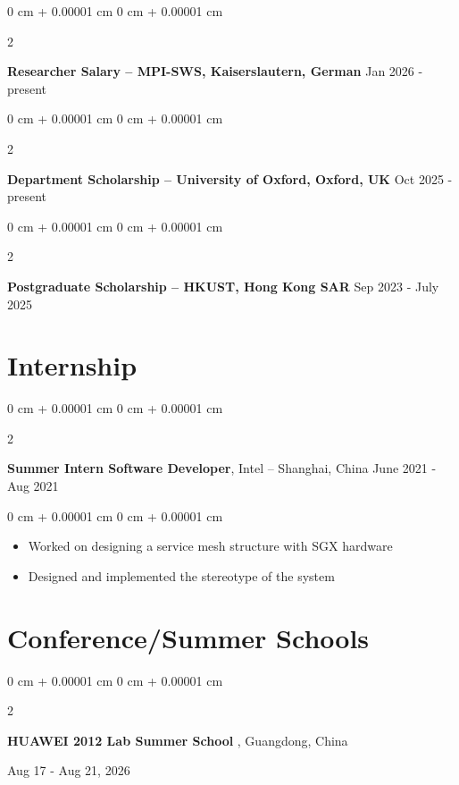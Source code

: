 \documentclass[10pt, letterpaper]{article}
\newenvironment{highlights}{
    \begin{itemize}[
        topsep=0.10 cm,
        parsep=0.10 cm,
        partopsep=0pt,
        itemsep=0pt,
        leftmargin=0 cm + 10pt
    ]
}{
    \end{itemize}
} %
\newenvironment{onecolentry}{
    \begin{adjustwidth}{
        0 cm + 0.00001 cm
    }{
        0 cm + 0.00001 cm
    }
}{
    \end{adjustwidth}
} %
\newenvironment{twocolentry}[2][]{
    \onecolentry
    \def\secondColumn{#2}
    \setcolumnwidth{\fill, 4.5 cm}
    \begin{paracol}{2}
}{
    \switchcolumn \raggedleft \secondColumn
    \end{paracol}
    \endonecolentry
} %
\begin{document}
 \begin{twocolentry}{
            Jan 2026 - present
        }
            \textbf{Researcher Salary -- MPI-SWS, Kaiserslautern, German}\end{twocolentry}

        \vspace{0.10 cm}
    

 \begin{twocolentry}{
            Oct 2025 - present
        }
            \textbf{Department Scholarship -- University of Oxford, Oxford, UK}\end{twocolentry}

        \vspace{0.10 cm}

    
    \begin{twocolentry}{
            Sep 2023 - July 2025
        }
            \textbf{Postgraduate Scholarship -- HKUST, Hong Kong SAR}\end{twocolentry}

        \vspace{0.10 cm}


    
    \section{Internship}
        \begin{twocolentry}{
            June 2021 - Aug 2021
        }
            \textbf{Summer Intern Software Developer}, Intel -- Shanghai, China\end{twocolentry}

        \vspace{0.10 cm}
        \begin{onecolentry}
            \begin{highlights}
                \item Worked on designing a service mesh structure with SGX hardware
                \item Designed and implemented the stereotype of the system
            \end{highlights}
        \end{onecolentry}


    \section{Conference/Summer Schools}
        \begin{twocolentry}{
            Aug 17 - Aug 21, 2026
        }
        \textbf{HUAWEI 2012 Lab Summer School} , Guangdong, China
        \end{twocolentry}
\end{document}
